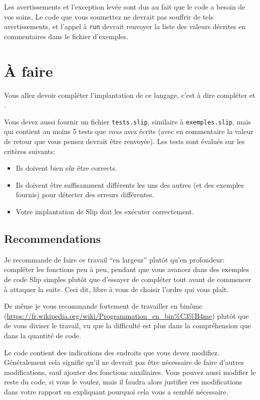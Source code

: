 \documentclass{article}
\begin{document}
Les avertissements et l'exception levée sont dus au fait que le code
a besoin de vos soins.  Le code que vous soumettez ne devrait pas souffrir
de tels avertissements, et l'appel à \texttt{run} devrait renvoyer la liste
des valeurs décrites en commentaires dans le fichier d'exemples.

\section{À faire}

Vous allez devoir compléter l'implantation de ce langage, c'est à dire
compléter  et .

Vous devez aussi fournir un fichier \texttt{tests.slip}, similaire
à \texttt{exemples.slip}, mais qui contient au moins 5 tests que \emph{vous}
avez écrits (avec en commentaire la valeur de retour que vous pensez devrait
être renvoyée).  Les tests sont évalués sur les critères suivants:
\begin{itemize}
\item Ils doivent bien sûr être corrects.
\item Ils doivent être suffisamment différents les uns des autres (et des
  exemples fournis) pour détecter des erreurs différentes.
\item Votre implantation de Slip doit les exécuter correctement.
\end{itemize}

\subsection{Recommendations}

Je recommande de faire ce travail ``en largeur'' plutôt qu'en profondeur:
compléter les fonctions peu à peu, pendant que vous avancez dans des
exemples de code Slip simples plutôt que d'essayer de compléter tout
 avant de commencer à attaquer la suite.
Ceci dit, libre à vous de choisir l'ordre qui vous plaît.

De même je vous recommande fortement de travailler en binôme
(\url{https://fr.wikipedia.org/wiki/Programmation_en_bin\%C3\%B4me}) plutôt
que de vous diviser le travail, vu que la difficulté est plus dans la
compréhension que dans la quantité de code.

Le code contient des indications des endroits que vous devez modifiez.
Généralement cela signifie qu'il ne devrait pas être nécessaire de faire
d'autres modifications, sauf ajouter des fonctions auxiliaires.  Vous pouvez
aussi modifier le reste du code, si vous le voulez, mais il faudra alors
justifier ces modifications dans votre rapport en expliquant pourquoi cela
vous a semblé nécessaire.
\end{document}
